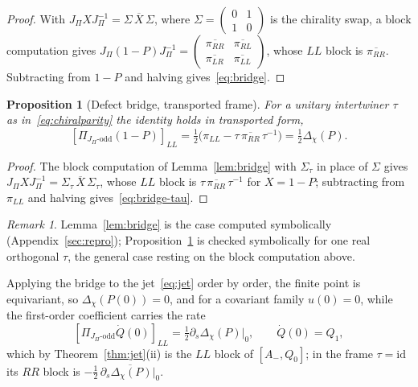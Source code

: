 \documentclass[11pt]{article}
\newtheorem{proposition}{Proposition}
\theoremstyle{definition}
\theoremstyle{remark}
\newtheorem{remark}{Remark}
\newcommand{\JPi}{J_{\Pi}}
\newcommand{\Dchi}{\Delta_{\chi}}
\newcommand{\Podd}{\Pi_{\JPi\text{-odd}}}
\begin{document}
    \begin{proof}
      With $\JPi X \JPi^{-1} = \Sigma\,\overline{X}\,\Sigma$, where $\Sigma = \left(\begin{smallmatrix}0&1\\1&0\end{smallmatrix}\right)$
      is the chirality swap, a block computation gives
      $\JPi(1-P)\JPi^{-1} = \left(\begin{smallmatrix}\overline{\pi_{RR}}&\overline{\pi_{RL}}\\\overline{\pi_{LR}}&\overline{\pi_{LL}}\end{smallmatrix}\right)$,
      whose $LL$ block is $\overline{\pi_{RR}}$.
      Subtracting from $1-P$ and halving gives~\eqref{eq:bridge}.
    \end{proof}

    \begin{proposition}[Defect bridge, transported frame]
      \label{prop:bridge-tau}
      For a unitary intertwiner $\tau$ as in~\eqref{eq:chiralparity} the identity holds in transported form,
      \begin{equation}
        \label{eq:bridge-tau}
        [\Podd(1-P)]_{LL} = \tfrac12\bigl(\pi_{LL} - \tau\,\overline{\pi_{RR}}\,\tau^{-1}\bigr) = \tfrac12 \Dchi(P).
      \end{equation}
      \end{proposition}

    \begin{proof}
      The block computation of Lemma~\ref{lem:bridge} with $\Sigma_\tau$ in place of $\Sigma$ gives
      $\JPi X \JPi^{-1} = \Sigma_\tau\,\overline{X}\,\Sigma_\tau$, whose $LL$ block is
      $\tau\,\overline{\pi_{RR}}\,\tau^{-1}$
      for $X = 1-P$; subtracting from $\pi_{LL}$ and halving gives~\eqref{eq:bridge-tau}.
    \end{proof}

    \begin{remark}
      \label{rem:tau}
      Lemma~\ref{lem:bridge} is the case computed symbolically (Appendix~\ref{sec:repro});
      Proposition~\ref{prop:bridge-tau}
      is checked symbolically for one real orthogonal $\tau$, the general case resting on the block computation above.
    \end{remark}

    Applying the bridge to the jet~\eqref{eq:jet} order by order, the finite point is equivariant, so $\Dchi(P(0)) =
    0$, and for a covariant family
    $u(0) = 0$, while the first-order coefficient carries the rate
    \begin{equation}
      \label{eq:rate}
      [\Podd \dot Q(0)]_{LL} = \tfrac12 \partial_s \Dchi(P)\big|_0,
      \qquad \dot Q(0) = Q_1,
    \end{equation}
    which by Theorem~\ref{thm:jet}(ii) is the $LL$ block of $[A_-, Q_0]$; in the frame $\tau = \mathrm{id}$ its $RR$
    block is $-\tfrac12\,\overline{\partial_s \Dchi(P)|_0}$.
\end{document}
